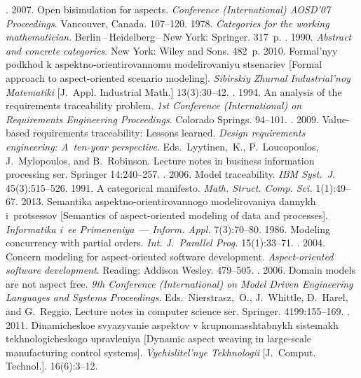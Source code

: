 \begin{multicols}{2}
{{\begin{thebibliography}{99}
. 2007. Open bisimulation for aspects.
\textit{Conference (International) AOSD'07 Proceedings}. Vancouver, Canada. 107--120.
 1978. \textit{Categories for the working mathematician}.
Berlin\,--\,Heidelberg\,--\,New York: Springer. 317~p.
. 1990. \textit{Abstract and
concrete categories}. New York: Wiley and Sons. 482~p.
 2010. Formal'nyy podkhod k aspektno-orientirovannomu
modelirovaniyu stsenariev [Formal approach to aspect-oriented scenario
modeling]. \textit{Sibirskiy Zhurnal
Industrial'noy Matematiki} [J.~Appl. Industrial Math.] 13(3):30--42.
. 1994. An analysis of the requirements traceability problem.
\textit{1st Conference (International) on Requirements Engineering Proceedings}. Colorado
Springs. 94--101.
. 2009. Value-based
requirements traceability: Lessons learned.
\textit{Design requirements engineering:
A~ten-year perspective}. Eds.\ Lyytinen,~K.,  P.~Loucopoulos, J.~Mylopoulos,
and B.~Robinson. Lecture notes in business information processing ser.
Springer 14:240--257.
. 2006. Model traceability.
\textit{IBM Syst.~J.} 45(3):515--526.
 1991. A categorical manifesto. \textit{Math. Struct. Comp. Sci.}
1(1):49--67.
 2013. Semantika aspektno-ori\-en\-ti\-ro\-van\-nogo
modelirovaniya dannykh i~protsessov [Semantics of aspect-oriented
modeling of data and processes]. \textit{Informatika i~ee
Primeneniya}~--- \textit{Inform. Appl.} 7(3):70--80.
 1986. Modeling concurrency with partial orders. \textit{Int. J.~Parallel
Prog.} 15(1):33--71.
. 2004. Concern modeling for aspect-oriented software
development. \textit{Aspect-oriented software development}. Reading: Addison Wesley. 479--505.
. 2006. Domain models are not aspect free.
\textit{9th Conference (International) on Model Driven Engineering Languages and
Systems Proceedings}.  Eds.\ Nierstrasz,~O., J.~Whittle, D.~Harel, and G.~Reggio.
Lecture notes in computer science ser. Springer. 4199:155--169.
. 2011. Dinamicheskoe svyazyvanie aspektov v
krupnomasshtabnykh sistemakh tekhnologicheskogo
upravleniya [Dynamic aspect weaving in large-scale manufacturing control systems].
\textit{Vychislitel'nye Tekhnologii} [J.~Comput.
Technol.]. 16(6):3--12.
\end{thebibliography}

 }
 }

\end{multicols}

